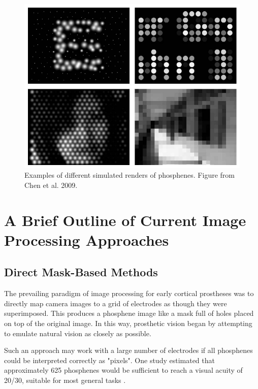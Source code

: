 \documentclass[a4paper,11pt,openany]{book}
\begin{document}
\begin{figure}[htbp]
\centering
\includegraphics[width=.9\linewidth]{./graphics/litreview/simulated.png}
\caption[Examples of different simulated renders of phosphenes]{\label{fig:org89b4581}
Examples of different simulated renders of phosphenes. Figure from Chen et al. 2009. \cite{chen_simulating_2009-1}}
\end{figure}

\section*{A Brief Outline of Current Image Processing Approaches}
\label{sec:orga2e4b30}
\subsection*{Direct Mask-Based Methods}
\label{sec:org159698d}

The prevailing paradigm of image processing for early cortical prostheses was to directly map camera images to a grid of electrodes as though they were superimposed. \cite{schmidt_feasibility_1996,dobelle_artificial_2000}
This produces a phosphene image like a mask full of holes placed on top of the original image.
In this way, prosthetic vision began by attempting to emulate natural vision as closely as possible.

Such an approach may work with a large number of electrodes if all phosphenes could be interpreted correctly as "pixels".
One study estimated that approximately 625 phosphenes would be sufficient to reach a visual acuity of 20/30, suitable for most general tasks \cite{cha_simulation_1992}.
\end{document}
